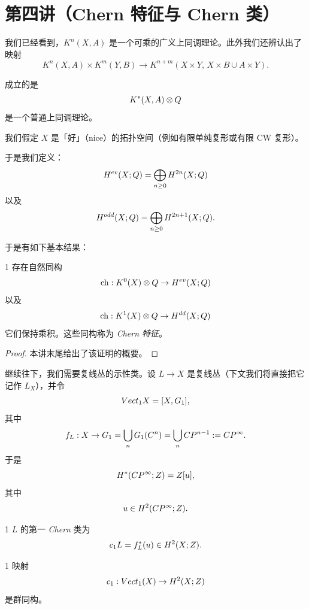 
\section{第四讲（Chern 特征与 Chern 类）}

我们已经看到，$K^n(X,A)$ 是一个可乘的广义上同调理论。此外我们还辨认出了映射
\[ K^n(X,A)\times K^m(Y,B)\to K^{n+m}(X\times Y,\, X\times B\cup A\times Y). \]

成立的是
\[ K^*(X,A)\otimes Q \]
是一个普通上同调理论。

我们假定 $X$ 是「好」（nice）的拓扑空间（例如有限单纯复形或有限 CW 复形）。

于是我们定义：
\[ H^{ev}(X;Q) = \bigoplus_{n\ge 0} H^{2n}(X;Q) \]
以及
\[ H^{odd}(X;Q) = \bigoplus_{n\ge 0} H^{2n+1}(X;Q). \]

于是有如下基本结果：

\begin{thm}{1}
存在自然同构
\[ \operatorname{ch} : K^0(X)\otimes Q\to H^{ev}(X;Q) \]
以及
\[ \operatorname{ch} : K^1(X)\otimes Q\to H^{dd}(X;Q) \]
它们保持乘积。这些同构称为 \emph{Chern 特征}。
\end{thm}

\begin{proof}
本讲末尾给出了该证明的概要。
\end{proof}

继续往下，我们需要复线丛的示性类。设 $L\to X$ 是复线丛（下文我们将直接把它记作 $L_X$），并令
\[ Vect_1 X = [X, G_1], \]
其中
\[ f_L : X\to G_1 = \bigcup_n G_1(C^n) = \bigcup_n C P^{n-1} := C P^\infty. \]
于是
\[ H^*(C P^\infty;Z) = Z[u], \]
其中
\[ u\in H^2(C P^\infty;Z). \]

\begin{defn}{1}
$L$ 的第一 \emph{Chern} 类为
\[ c_1 L = f_L^*(u)\in H^2(X;Z). \]
\end{defn}

\begin{lem}{1}
映射
\[ c_1 : Vect_1(X)\to H^2(X;Z) \]
是群同构。
\end{lem}

